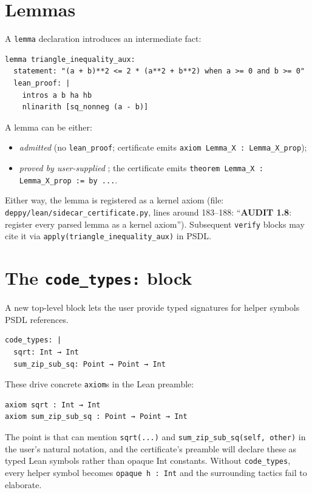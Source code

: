 \section{Lemmas}
\label{sec:lemmas}

A \texttt{lemma} declaration introduces an intermediate fact:

\begin{lstlisting}[language=deppyfile]
lemma triangle_inequality_aux:
  statement: "(a + b)**2 <= 2 * (a**2 + b**2) when a >= 0 and b >= 0"
  lean_proof: |
    intros a b ha hb
    nlinarith [sq_nonneg (a - b)]
\end{lstlisting}

A lemma can be either:
\begin{itemize}[leftmargin=1.7em]
  \item \emph{admitted} (no \texttt{lean\_proof}; certificate emits
    \texttt{axiom Lemma\_X : Lemma\_X\_prop});
  \item \emph{proved by user-supplied \Lean{}}; the certificate
    emits \texttt{theorem Lemma\_X : Lemma\_X\_prop := by ...}.
\end{itemize}

Either way, the lemma is registered as a kernel axiom (file:
\texttt{deppy/lean/sidecar\_certificate.py}, lines around 183--188:
``\textbf{AUDIT 1.8}: register every parsed lemma as a kernel
axiom'').  Subsequent \texttt{verify} blocks may cite it via
\texttt{apply(triangle\_inequality\_aux)} in PSDL.

\section{The \texttt{code\_types:} block}
\label{sec:code-types}

A new top-level block lets the user provide typed signatures for
helper symbols PSDL references.

\begin{lstlisting}[language=deppyfile,caption={A \texttt{code\_types:} block.}]
code_types: |
  sqrt: Int → Int
  sum_zip_sub_sq: Point → Point → Int
\end{lstlisting}

These drive concrete \texttt{axiom}s in the Lean preamble:
\begin{lstlisting}[language=lean4]
axiom sqrt : Int → Int
axiom sum_zip_sub_sq : Point → Point → Int
\end{lstlisting}

The point is that \PSDL{} can mention \texttt{sqrt(...)} and
\texttt{sum\_zip\_sub\_sq(self, other)} in the user's natural
notation, and the certificate's preamble will declare these as
typed Lean symbols rather than opaque Int constants.  Without
\texttt{code\_types}, every helper symbol becomes
\texttt{opaque h : Int} and the surrounding tactics fail to
elaborate.

